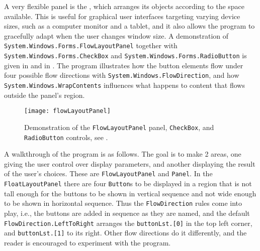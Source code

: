 A very flexible panel is the , which arranges its objects according to the space available. This is useful for graphical user interfaces targeting varying device sizes, such as a computer monitor and a tablet, and it also allows the program to gracefully adapt when the user changes window size. A demonstration of \lstinline{System.Windows.Forms.FlowLayoutPanel} together with \lstinline{System.Windows.Forms.CheckBox} and \lstinline{System.Windows.Forms.RadioButton} is given in  and in . The program illustrates how the button elements flow under four possible flow directions with \lstinline{System.Windows.FlowDirection}, and how \lstinline{System.Windows.WrapContents} influences what happens to content that flows outside the panel's region. 
%
%
%
\begin{figure}
  \centering
  \texttt{[image: flowLayoutPanel]}
  \caption{Demonstration of the \lstinline!FlowLayoutPanel! panel, \lstinline!CheckBox!, and \lstinline!RadioButton! controls, see .}
  \label{fig:flowLayoutPanel}
\end{figure}
A walkthrough of the program is as follows. The goal is to make 2 areas, one giving the user control over display parameters, and another displaying the result of the user's choices. These are \lstinline{FlowLayoutPanel} and \lstinline{Panel}. In the \lstinline{FloatLayoutPanel} there are four \lstinline{Button}s to be displayed in a region that is not tall enough for the buttons to be shown in vertical sequence and not wide enough to be shown in horizontal sequence. Thus the \lstinline{FlowDirection} rules come into play, i.e., the buttons are added in sequence as they are named, and the default \lstinline{FlowDirection.LeftToRight} arranges the \lstinline{buttonLst.[0]} in the top left corner, and \lstinline{buttonLst.[1]} to its right. Other flow directions do it differently, and the reader is encouraged to experiment with the program.

